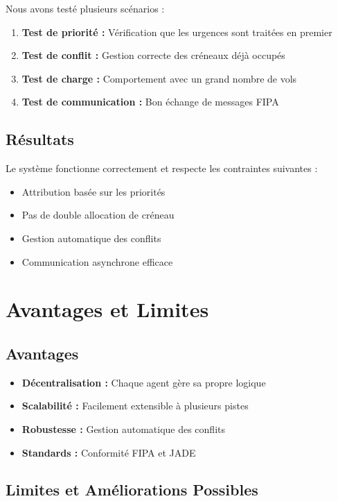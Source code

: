 \documentclass[12pt,a4paper]{article}
\begin{document}
Nous avons testé plusieurs scénarios :

\begin{enumerate}
    \item \textbf{Test de priorité :} Vérification que les urgences sont traitées en premier
    \item \textbf{Test de conflit :} Gestion correcte des créneaux déjà occupés
    \item \textbf{Test de charge :} Comportement avec un grand nombre de vols
    \item \textbf{Test de communication :} Bon échange de messages FIPA
\end{enumerate}

\subsection{Résultats}

Le système fonctionne correctement et respecte les contraintes suivantes :
\begin{itemize}
    \item[\checkmark] Attribution basée sur les priorités
    \item[\checkmark] Pas de double allocation de créneau
    \item[\checkmark] Gestion automatique des conflits
    \item[\checkmark] Communication asynchrone efficace
\end{itemize}

\section{Avantages et Limites}

\subsection{Avantages}

\begin{itemize}
    \item \textbf{Décentralisation :} Chaque agent gère sa propre logique
    \item \textbf{Scalabilité :} Facilement extensible à plusieurs pistes
    \item \textbf{Robustesse :} Gestion automatique des conflits
    \item \textbf{Standards :} Conformité FIPA et JADE
\end{itemize}

\subsection{Limites et Améliorations Possibles}
\end{document}
